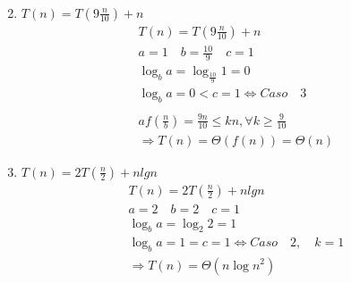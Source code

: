 \documentclass[dcc,uchile,sol]{fcfmcourse}
\begin{document}
\begin{problems}
\begin{enumerate}
\begin{align*}
    \end{align*}
    \item $T(n)=T(9\frac{n}{10})+n$
    \begin{align*}
        T(n)=T(9\frac { n }{ 10 } )+n\\ a=1\quad b=\frac { 10 }{ 9 } \quad c=1\\ \log _{ b }{ a } =\log _{ \frac { 10 }{ 9 }  }{ 1 } =0\\ \log _{ b }{ a } =0<c=1\Leftrightarrow Caso\quad 3\\ \\ af(\frac { n }{ b } )=\frac { 9n }{ 10 }\le kn, \forall k\ge \frac{9}{10}\\
        \Rightarrow T(n)=\Theta(f(n))=\Theta(n)
    \end{align*}
    \item $T(n)=2T(\frac{n}{2})+nlgn$
    \begin{align*}
        T(n)=2T(\frac { n }{ 2 } )+nlgn\\ a=2\quad b=2\quad c=1\\ \log _{ b }{ a } =\log _{ 2 }{ 2 } =1\\ \log _{ b }{ a } =1=c=1\Leftrightarrow Caso\quad 2,\quad k=1\\ \Rightarrow T(n)=\Theta (n{ \log { n }  }^{ 2 })
    \end{align*}
\end{enumerate}


\end{problems}
\end{document}
